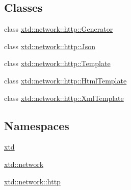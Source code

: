 \subsection*{Classes}
\begin{DoxyCompactItemize}
\item 
class \hyperlink{classxtd_1_1network_1_1http_1_1Generator}{xtd\-::network\-::http\-::\-Generator}
\item 
class \hyperlink{classxtd_1_1network_1_1http_1_1Json}{xtd\-::network\-::http\-::\-Json}
\item 
class \hyperlink{classxtd_1_1network_1_1http_1_1Template}{xtd\-::network\-::http\-::\-Template}
\item 
class \hyperlink{classxtd_1_1network_1_1http_1_1HtmlTemplate}{xtd\-::network\-::http\-::\-Html\-Template}
\item 
class \hyperlink{classxtd_1_1network_1_1http_1_1XmlTemplate}{xtd\-::network\-::http\-::\-Xml\-Template}
\end{DoxyCompactItemize}
\subsection*{Namespaces}
\begin{DoxyCompactItemize}
\item 
\hyperlink{namespacextd}{xtd}
\item 
\hyperlink{namespacextd_1_1network}{xtd\-::network}
\item 
\hyperlink{namespacextd_1_1network_1_1http}{xtd\-::network\-::http}
\end{DoxyCompactItemize}

